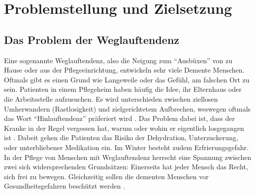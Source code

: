 \section{Problemstellung und Zielsetzung}\label{sec:definitionen}
\subsection{Das Problem der Weglauftendenz}\label{ssec:weglauftendenz}
Eine sogenannte Weglauftendenz, also die Neigung zum \enquote{Ausbüxen} von zu Hause oder aus der Pflegeeinrichtung, entwickeln sehr viele Demente Menschen. Oftmals gibt es einen Grund wie Langeweile oder das Gefühl, am falschen Ort zu sein. Patienten in einem Pflegeheim haben häufig die Idee, ihr Elternhaus oder die Arbeitsstelle aufzusuchen. Es wird unterschieden zwischen ziellosen Umherwandern (Rastlosigkeit) und zielgerichtetem Aufbrechen, weswegen oftmals das Wort \enquote{Hinlauftendenz} präferiert wird \citep[Vgl.][]{hinlauf}. Das Problem dabei ist, dass der Kranke in der Regel vergessen hat, warum oder wohin er eigentlich losgegangen ist \citep[Vgl.][]{dgk}. Dabeit gehen die Patienten das Risiko der Dehydration, Unterzuckerung, oder unterbliebener Medikation ein. Im Winter besteht zudem Erfrierungsgefahr. In der Pflege von Menschen mit Weglauftendenz herrscht eine Spannung zwischen zwei sich widersprechenden Grundsätzen: Einerseits hat jeder Mensch das Recht, sich frei zu bewegen. Gleichzeitig sollen die dementen Menschen vor Gesundheitsgefahren beschützt werden \citep[Vgl.][]{pqsg}.
